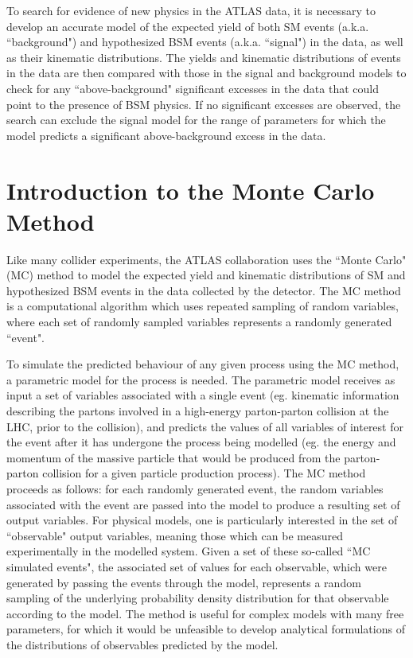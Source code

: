 \label{chapter:mc}

To search for evidence of new physics in the ATLAS data, it is necessary to develop an accurate model of the expected yield of both SM events (a.k.a. ``background") and hypothesized BSM events (a.k.a. ``signal") in the data, as well as their kinematic distributions. The yields and kinematic distributions of events in the data are then compared with those in the signal and background models to check for any ``above-background" significant excesses in the data that could point to the presence of BSM physics. If no significant excesses are observed, the search can exclude the signal model for the range of parameters for which the model predicts a significant above-background excess in the data.

\section{Introduction to the Monte Carlo Method}
\label{sec:mc_intro}

Like many collider experiments, the ATLAS collaboration uses the ``Monte Carlo" (MC) method to model the expected yield and kinematic distributions of SM and hypothesized BSM events in the data collected by the detector. The MC method is a computational algorithm which uses repeated sampling of random variables, where each set of randomly sampled variables represents a randomly generated ``event". 

To simulate the predicted behaviour of any given process using the MC method, a parametric model for the process is needed. The parametric model receives as input a set of variables associated with a single event (eg. kinematic information describing the partons involved in a high-energy parton-parton collision at the LHC, prior to the collision), and predicts the values of all variables of interest for the event after it has undergone the process being modelled (eg. the energy and momentum of the massive particle that would be produced from the parton-parton collision for a given particle production process). The MC method proceeds as follows: for each randomly generated event, the random variables associated with the event are passed into the model to produce a resulting set of output variables. For physical models, one is particularly interested in the set of ``observable" output variables, meaning those which can be measured experimentally in the modelled system. Given a set of these so-called ``MC simulated events", the associated set of values for each observable, which were generated by passing the events through the model, represents a random sampling of the underlying probability density distribution for that observable according to the model.  The method is useful for complex models with many free parameters, for which it would be unfeasible to develop analytical formulations of the distributions of observables predicted by the model.

